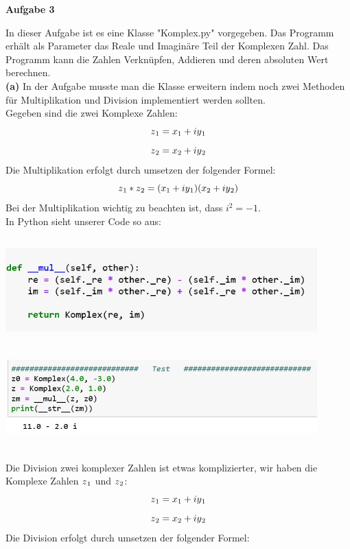 \documentclass[12pt,oneside,a4paper]{article}
\begin{document}
\begin{flushleft}
\begin{center}
\end{center}
\begin{center}
\bigskip
\bigskip
\bigskip
\LARGE
 \textbf{Aufgabe 3} 
\bigskip
\bigskip
\end{center}
In dieser Aufgabe ist es eine Klasse "Komplex.py" vorgegeben. Das Programm erhält als Parameter das Reale und Imaginäre Teil der Komplexen Zahl. Das Programm kann die Zahlen Verknüpfen, Addieren und deren absoluten Wert berechnen.\\
\bigskip
\textbf{(a)} In der Aufgabe musste man die Klasse erweitern indem noch zwei Methoden für Multiplikation und Division implementiert werden sollten.\\
Gegeben sind die zwei Komplexe Zahlen:
$$ z\textsubscript{1} = x\textsubscript{1} + iy\textsubscript{1}$$ $$z\textsubscript{2} = x\textsubscript{2} + iy\textsubscript{2} $$
Die Multiplikation erfolgt durch umsetzen der folgender Formel: 
$$ z\textsubscript{1} * z\textsubscript{2} = ( x\textsubscript{1} + iy\textsubscript{1})( x\textsubscript{2} + iy\textsubscript{2})$$
Bei der Multiplikation wichtig zu beachten ist, dass  $i^2 = -1$.\\
\bigskip
In Python sieht unserer Code so aus:
\begin{center}
\includegraphics[width=12cm,height=4cm]{Mul}
\includegraphics[width=12cm,height=4cm]{Mul2}
\end{center}
Die Division zwei komplexer Zahlen ist etwas komplizierter, wir haben die Komplexe Zahlen $z\textsubscript{1}$ und $z\textsubscript{2}$:
$$ z\textsubscript{1} = x\textsubscript{1} + iy\textsubscript{1}$$ $$z\textsubscript{2} = x\textsubscript{2} + iy\textsubscript{2} $$
Die Division erfolgt durch umsetzen der folgender Formel: 

\end{flushleft}
\end{document}

